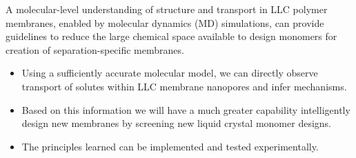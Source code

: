 \documentclass{article}
\begin{document}
  A molecular-level understanding of structure and transport in LLC polymer 
  membranes, enabled by molecular dynamics (MD) simulations, can provide 
  guidelines to reduce the large chemical space available to design
  monomers for creation of separation-specific membranes. 
  \begin{itemize}
    \item Using a sufficiently accurate molecular model, we can directly 
    observe transport of solutes within LLC membrane nanopores and infer
    mechanisms. 
    \item Based on this information we will have a much greater capability
    intelligently design new membranes by screening new liquid crystal 
    monomer designs.
    \item The principles learned can be implemented and tested experimentally.
  \end{itemize}
  
\end{document}

